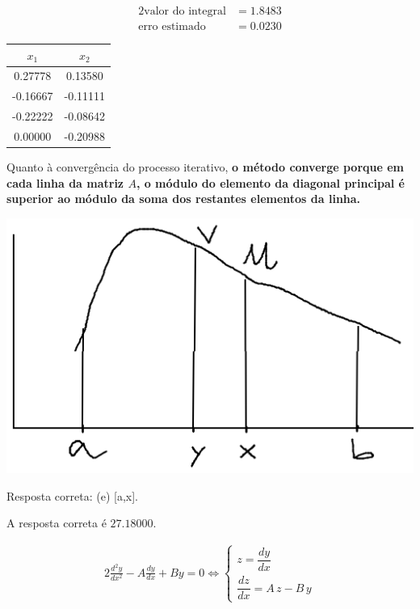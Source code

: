 \setcounter{chapter}{14}


\begin{alignat*}{2}
	\text{valor do integral} &= 1.8483\\
	\text{erro estimado}     &= 0.0230
\end{alignat*}


\begin{center} \begin{tabular}{c | c}
	$x_1   $ & $x_2$ \\ \hline
	 0.27778 &  0.13580 \\
	-0.16667 & -0.11111 \\
	-0.22222 & -0.08642 \\
	 0.00000 & -0.20988
\end{tabular} \end{center}
Quanto à convergência do processo iterativo, \textbf{o método converge porque em cada linha da matriz $A$, o módulo do elemento da diagonal principal é superior ao módulo da soma dos restantes elementos da linha.}

\begin{center} \includegraphics[scale=0.5]{2015T2_3} \end{center}
Resposta correta: (e) [a,x].

A resposta correta é $27.18000$.

\begin{alignat*}{2}
	\frac{d^2y}{dx^2}-A\frac{dy}{dx}+By=0 \iff
	\begin{cases}
		z = \dfrac{dy}{dx}\\
		\dfrac{dz}{dx}=A\,z-B\,y
	\end{cases}
\end{alignat*}

